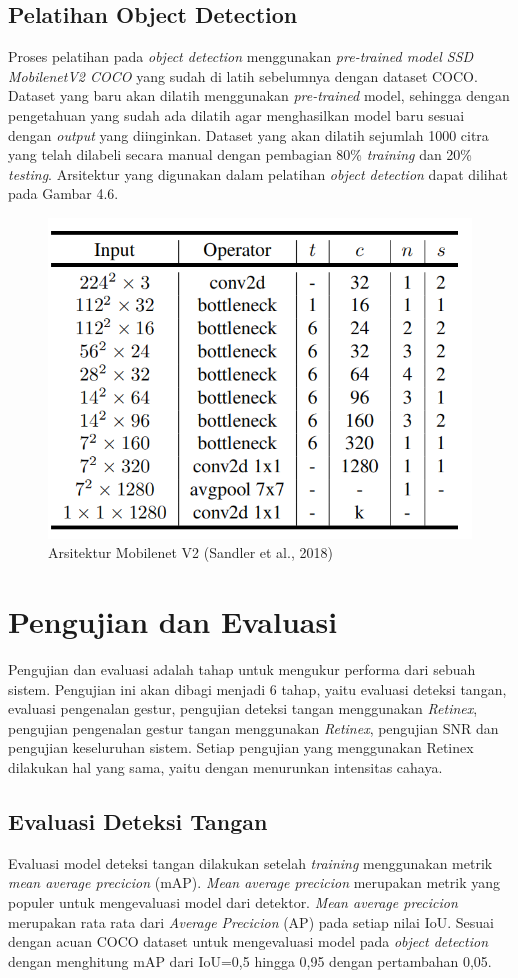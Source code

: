 \subsection{Pelatihan Object Detection}
Proses pelatihan pada \emph{object detection} menggunakan \emph{pre-trained model SSD MobilenetV2 COCO} yang sudah di latih sebelumnya dengan dataset COCO.
Dataset yang baru akan dilatih menggunakan \emph{pre-trained} model, sehingga dengan pengetahuan yang sudah ada dilatih agar menghasilkan model baru sesuai dengan \emph{output} yang diinginkan. 
Dataset yang akan dilatih sejumlah 1000 citra yang telah dilabeli secara manual dengan pembagian 80\% \emph{training} dan 20\% \emph{testing}.
Arsitektur yang digunakan dalam pelatihan \emph{object detection} dapat dilihat pada Gambar 4.6.
\begin{figure}[H]
	\centering
	\includegraphics[width=0.7\linewidth]{"v2"}
	\caption{Arsitektur Mobilenet V2 (Sandler et al., 2018)}
	\label{fig:v2}
\end{figure}
\section{Pengujian dan Evaluasi}
Pengujian dan evaluasi adalah tahap untuk mengukur performa dari sebuah sistem. Pengujian ini akan dibagi menjadi 6 tahap, yaitu evaluasi deteksi tangan, evaluasi pengenalan gestur, pengujian deteksi tangan menggunakan \emph{Retinex}, pengujian pengenalan gestur tangan menggunakan \emph{Retinex}, pengujian SNR dan pengujian keseluruhan sistem. 
Setiap pengujian yang menggunakan Retinex dilakukan hal yang sama, yaitu dengan menurunkan intensitas cahaya.
\subsection{Evaluasi Deteksi Tangan}
Evaluasi model deteksi tangan dilakukan setelah \emph{training} menggunakan metrik \emph{mean average precicion} (mAP). \emph{Mean average precicion} merupakan metrik yang populer untuk mengevaluasi model dari detektor. \emph{Mean average precicion} merupakan rata rata dari \emph{Average Precicion} (AP) pada setiap nilai IoU. Sesuai dengan acuan COCO dataset untuk mengevaluasi model pada \emph{object detection} dengan menghitung mAP dari IoU=0,5 hingga 0,95 dengan pertambahan 0,05.
